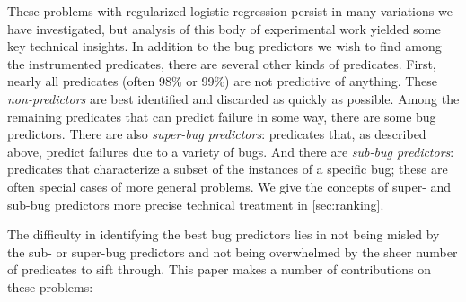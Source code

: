 \documentclass[preprint,final]{sigplanconf}
\newcommand{\termdef}[1]{\emph{#1}}
\begin{document}
These problems with regularized logistic regression persist in many variations
we have investigated, but analysis of this body of experimental work yielded some
key technical insights.  In addition to the bug predictors we wish to
find among the instrumented predicates, there are several other kinds
of predicates.  First, nearly all predicates (often 98\% or 99\%) are
not predictive of anything.  These \termdef{non-predictors} are best identified and discarded as
quickly as possible. Among the remaining predicates that can
predict failure in some way, there are some bug predictors.
There are also \termdef{super-bug predictors}: predicates that, as
described above, predict failures due to a variety of bugs.  And there
are \termdef{sub-bug predictors}: predicates that characterize a subset of
the instances of a specific bug; these are often special cases of more
general problems.  We give the concepts of super- and sub-bug
predictors more precise technical treatment in
\autoref{sec:ranking}.

The difficulty in identifying the best bug predictors lies in not being
misled by the sub- or super-bug predictors and not being overwhelmed
by the sheer number of predicates to sift through.
This paper makes a number of contributions on these problems:
\end{document}
